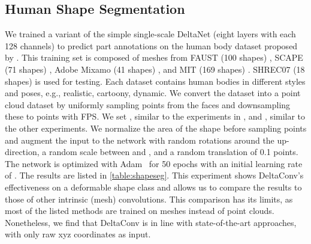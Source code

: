 \documentclass[acmtog, authorversion]{acmart}
\begin{document}
\subsection{Human Shape Segmentation}
We trained a variant of the simple single-scale DeltaNet (eight layers with each 128 channels) to predict part annotations on the human body dataset proposed by \citet{maron2017convolutional}. This training set is composed of meshes from FAUST (100 shapes) \cite{faust2014}, SCAPE (71 shapes) \cite{scape2005}, Adobe Mixamo (41 shapes) \cite{adobe_2016}, and MIT (169 shapes) \cite{mit2008}. SHREC07 (18 shapes) is used for testing. Each dataset contains human bodies in different styles and poses, e.g., realistic, cartoony, dynamic. We convert the dataset into a point cloud dataset by uniformly sampling  points from the faces and downsampling these to  points with FPS. We set , similar to the experiments in \citet{Wiersma2020},  and , similar to the other experiments. We normalize the area of the shape before sampling points and augment the input to the network with random rotations around the up-direction, a random scale between  and , and a random translation of 0.1 points. The network is optimized with Adam~\cite{adamkingma} for 50 epochs with an initial learning rate of . The results are listed in \autoref{table:shapeseg}. This experiment shows DeltaConv's effectiveness on a deformable shape class and allows us to compare the results to those of other intrinsic (mesh) convolutions. This comparison has its limits, as most of the listed methods are trained on meshes instead of point clouds. Nonetheless, we find that DeltaConv is in line with state-of-the-art approaches, with only raw xyz coordinates as input.
 
\end{document}
